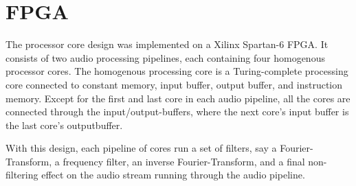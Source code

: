 \FloatBarrier
\section{FPGA}\label{chapter:fpga}

The processor core design was implemented on a Xilinx Spartan-6 FPGA. It
consists of two audio processing pipelines, each containing four homogenous
processor cores. The homogenous processing core is a Turing-complete processing
core connected to constant memory, input buffer, output buffer, and instruction
memory. Except for the first and last core in each audio pipeline, all the cores
are connected through the input/output-buffers, where the next core's input
buffer is the last core's outputbuffer.

With this design, each pipeline of cores run a set of filters, say a
Fourier-Transform, a frequency filter, an inverse Fourier-Transform, and a final
non-filtering effect on the audio stream running through the audio pipeline.







